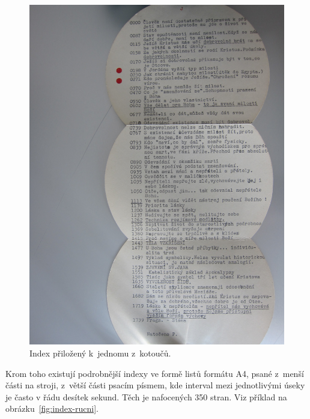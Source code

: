 \begin{figure}[htpb]
\includegraphics[scale=0.192]{rc/index-kotouc.jpg}
\caption{Index přiložený k~jednomu z~kotoučů.}
\label{fig:index-kotouc}
\end{figure}

Krom toho existují podrobnější indexy ve formě listů
formátu A4, psané z~menší části na stroji, z~větší části psacím písmem, kde
interval mezi jednotlivými úseky je často v řádu desítek sekund. Těch je
nafocených 350 stran. Viz příklad na obrázku~\ref{fig:index-rucni}.

